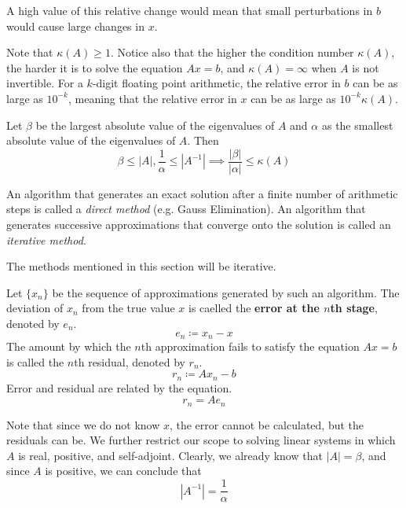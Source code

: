   A high value of this relative change would mean that small perturbations in $b$ would cause large changes in $x$.

  Note that $\kappa(A) \geq 1$. Notice also that the higher the condition number $\kappa (A)$, the harder it is to solve the equation $A x = b$, and $\kappa(A) = \infty$ when $A$ is not invertible. For a $k$-digit floating point arithmetic, the relative error in $b$ can be as large as $10^{-k}$, meaning that the relative error in $x$ can be as large as $10^{-k} \kappa (A)$. 

  Let $\beta$ be the largest absolute value of the eigenvalues of $A$ and $\alpha$ as the smallest absolute value of the eigenvalues of $A$. Then 
  \begin{equation}
    \beta \leq |A|, \frac{1}{\alpha} \leq |A^{-1}| \implies \frac{|\beta|}{|\alpha|} \leq \kappa(A)
  \end{equation}

  An algorithm that generates an exact solution after a finite number of arithmetic steps is called a \textit{direct method} (e.g. Gauss Elimination). An algorithm that generates successive approximations that converge onto the solution is called an \textit{iterative method}. 

  The methods mentioned in this section will be iterative. 

  \begin{definition}
    \label{def:error-at-the-nth-stage}
    Let $\{ x_n\}$ be the sequence of approximations generated by such an algorithm. The deviation of $x_n$ from the true value $x$ is caelled the \textbf{error at the $n$th stage}, denoted by $e_n$. 
    \begin{equation}
      e_n \coloneqq x_n - x
    \end{equation}
    The amount by which the $n$th approximation fails to satisfy the equation $Ax = b$ is called the $n$th residual, denoted by $r_n$. 
    \begin{equation}
      r_n \coloneqq A x_n - b
    \end{equation}
    Error and residual are related by the equation. 
    \begin{equation}
      r_n = A e_n
    \end{equation}
  \end{definition}

  Note that since we do not know $x$, the error cannot be calculated, but the residuals can be. We further restrict our scope to solving linear systems in which $A$ is real, positive, and self-adjoint. Clearly, we already know that $|A| = \beta$, and since $A$ is positive, we can conclude that 
  \begin{equation}
    |A^{-1}| = \frac{1}{\alpha}
  \end{equation}

